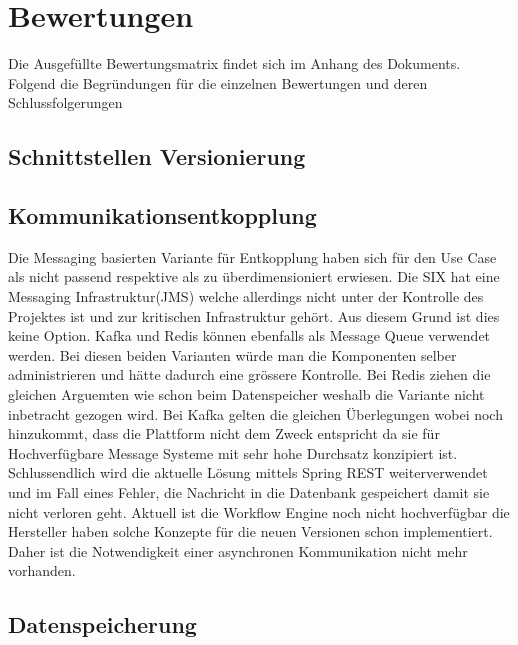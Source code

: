 \section{Bewertungen}

Die Ausgefüllte Bewertungsmatrix findet sich im Anhang des Dokuments. Folgend die Begründungen für die einzelnen Bewertungen und deren Schlussfolgerungen

\subsection{Schnittstellen Versionierung}


\subsection{Kommunikationsentkopplung}

Die Messaging basierten Variante für Entkopplung haben sich für den Use Case als nicht passend respektive als zu überdimensioniert erwiesen. Die SIX hat eine Messaging Infrastruktur(JMS) welche allerdings nicht unter der Kontrolle des Projektes ist und zur kritischen Infrastruktur gehört. Aus diesem Grund ist dies keine Option. Kafka und Redis können ebenfalls als Message Queue verwendet werden. Bei diesen beiden Varianten würde man die Komponenten selber administrieren und hätte dadurch eine grössere Kontrolle. Bei Redis ziehen die gleichen Arguemten wie schon beim Datenspeicher weshalb die Variante nicht inbetracht gezogen wird. Bei Kafka gelten die gleichen Überlegungen wobei noch hinzukommt, dass die Plattform nicht dem Zweck entspricht da sie für Hochverfügbare Message Systeme mit sehr hohe Durchsatz konzipiert ist.\newline
Schlussendlich wird die aktuelle Lösung mittels Spring REST weiterverwendet und im Fall eines Fehler, die Nachricht in die Datenbank gespeichert damit sie nicht verloren geht. Aktuell ist die Workflow Engine noch nicht hochverfügbar die Hersteller haben solche Konzepte für die neuen Versionen schon implementiert. Daher ist die Notwendigkeit einer asynchronen Kommunikation nicht mehr vorhanden.

\subsection{Datenspeicherung}

